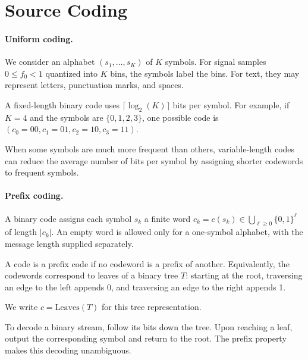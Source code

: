 \section{Source Coding}
\label{sec-shannon-source}

\newcommand{\Symb}{s}

   
\paragraph{Uniform coding.}

We consider an alphabet $(\Symb_1,\ldots,\Symb_K)$ of $K$ symbols. For signal samples $0 \leq f_0 < 1$ quantized into $K$ bins, the symbols label the bins. For text, they may represent letters, punctuation marks, and spaces.
 
A fixed-length binary code uses $\lceil \log_2(K) \rceil$ bits per symbol.
For example, if $K=4$ and the symbols are $\{0,1,2,3\}$, one possible code is $(c_0=00,c_1=01,c_2=10,c_3=11)$.

When some symbols are much more frequent than others, variable-length codes can reduce the average number of bits per symbol by assigning shorter codewords to frequent symbols.

   
\paragraph{Prefix coding.}
 

A binary code assigns each symbol $\Symb_k$ a finite word $c_k=c(\Symb_k)\in\bigcup_{\ell\geq0}\{0,1\}^{\ell}$ of length $|c_k|$. An empty word is allowed only for a one-symbol alphabet, with the message length supplied separately.
 
A code is a prefix code if no codeword is a prefix of another. Equivalently, the codewords correspond to leaves of a binary tree $T$: starting at the root, traversing an edge to the left appends 0, and traversing an edge to the right appends 1.
 
We write $c=\text{Leaves}(T)$ for this tree representation.



To decode a binary stream, follow its bits down the tree. Upon reaching a leaf, output the corresponding symbol and return to the root. The prefix property makes this decoding unambiguous.


